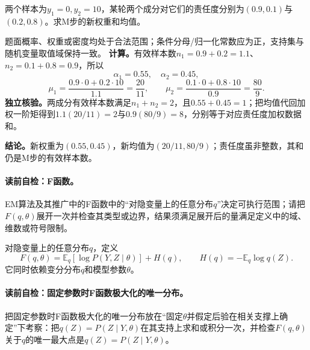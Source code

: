 \label{struct:V3-C04-CH18}
\begin{example}[责任度加权的高斯混合M步]\label{exm:V3-C04-three-coins-em}
两个样本为$y_1=0,y_2=10$，某轮两个成分对它们的责任度分别为$(0.9,0.1)$与$(0.2,0.8)$。求M步的新权重和均值。
\end{example}
\begin{solution}
\SolGiven 题面概率、权重或密度均处于合法范围；条件分母/归一化常数应为正，支持集与随机变量取值域保持一致。
\SolDerive
\textbf{计算。}有效样本数$n_1=0.9+0.2=1.1$、$n_2=0.1+0.8=0.9$，所以
\[
\alpha_1=0.55,\quad\alpha_2=0.45,
\]
\[
\mu_1=\frac{0.9\cdot0+0.2\cdot10}{1.1}=\frac{20}{11},\qquad
\mu_2=\frac{0.1\cdot0+0.8\cdot10}{0.9}=\frac{80}{9}.
\]
\textbf{独立核验。}两成分有效样本数满足$n_1+n_2=2$，且$0.55+0.45=1$；把均值代回加权一阶矩得到$1.1(20/11)=2$与$0.9(80/9)=8$，分别等于对应责任度加权数据和。

\textbf{结论。}新权重为$(0.55,0.45)$，新均值为$(20/11,80/9)$；责任度虽非整数，其和仍是M步的有效样本数。
\end{solution}


\paragraph{读前自检：F函数。}EM算法及其推广中的F函数中的“对隐变量上的任意分布$q$”决定可执行范围；请把$F(q,\theta)$展开一次并检查其类型或边界，结果须满足展开后的量满足定义中的域、维数或符号限制。\par

\begin{definition}[$F$函数]\label{def:V3-C04-F}
对隐变量上的任意分布$q$，定义
\[
F(q,\theta)=\mathbb E_q[\log P(Y,Z\mid\theta)]+H(q),
\qquad H(q)=-\mathbb E_q\log q(Z).
\]
它同时依赖变分分布$q$和模型参数$\theta$。
\end{definition}

\paragraph{读前自检：固定参数时F函数极大化的唯一分布。}把固定参数时F函数极大化的唯一分布放在“固定$\theta$并假定后验在相关支撑上确定”下考察：把$q(Z)=P(Z\mid Y,\theta)$在其支持上求和或积分一次，并检查$F(q,\theta)$关于$q$的唯一最大点是$q(Z)=P(Z\mid Y,\theta)$。\par

